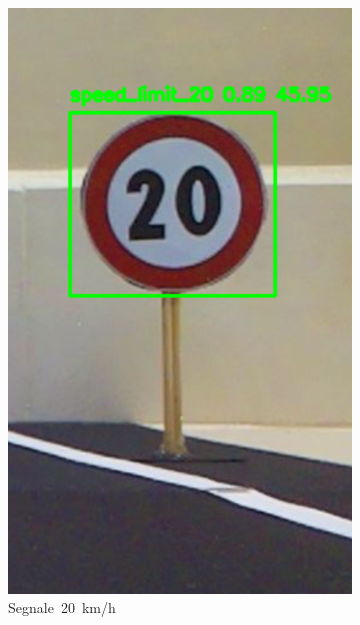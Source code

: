 \documentclass{article}
\begin{document}
\begin{figure}[h!]
\begin{subfigure}[b]{0.3\textwidth}
        \includegraphics[width=\linewidth]{img/20.png}
        \caption{Segnale 20 km/h}
        \label{fig:20}
    \end{subfigure}
    \hfill
    \begin{subfigure}[b]{0.3\textwidth}
        \centering

\end{subfigure}
\end{figure}
\end{document}
